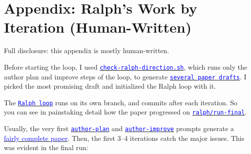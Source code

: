 \clearpage
\section{Appendix: Ralph's Work by Iteration (Human-Written)} \label{appendix:iter-log}

\providecommand{\rloopcommit}[2]{\href{https://github.com/chenandrewy/ralph-wiggum-asset-pricing/commit/#2}{\textcolor{blue}{\texttt{#1}}}}
\providecommand{\testresult}[1]{\href{https://github.com/chenandrewy/ralph-wiggum-asset-pricing/blob/42ce3a298a6c9e9ec144949346034b8af9055646/test-results/#1.md}{\textcolor{blue}{\texttt{#1}}}}
\providecommand{\penultimatetestresult}[1]{\href{https://github.com/chenandrewy/ralph-wiggum-asset-pricing/blob/36c13367ef5980dcf1e7e4963d89a7722c8377d0/test-results/#1.md}{\textcolor{blue}{\texttt{#1}}}}
\providecommand{\finaltestresult}[1]{\href{https://github.com/chenandrewy/ralph-wiggum-asset-pricing/blob/bf0af226ad2d15302dbe1c2878a1c2f66192e340/test-results/#1.md}{\textcolor{blue}{\texttt{#1}}}}

Full disclosure: this appendix is mostly human-written.

Before starting the loop, I used \href{https://github.com/chenandrewy/ralph-wiggum-asset-pricing/blob/main/check-ralph-direction.sh}{\textcolor{blue}{\texttt{check-ralph-direction.sh}}}, which runs only the author plan and improve steps of the loop, to generate \href{https://github.com/chenandrewy/ralph-wiggum-asset-pricing/tree/human-preface/ralph-garage/check-direction}{\textcolor{blue}{\texttt{several paper drafts}}}. I picked the most promising draft and initialized the Ralph loop with it.

The \href{https://github.com/chenandrewy/ralph-wiggum-asset-pricing/blob/main/ralph/ralph-loop.sh}{\textcolor{blue}{\texttt{Ralph loop}}} runs on its own branch, and commits after each iteration. So you can see in painstaking detail how the paper progressed on \href{https://github.com/chenandrewy/ralph-wiggum-asset-pricing/commits/ralph/run-final/}{\textcolor{blue}{\texttt{ralph/run-final}}}.

Usually, the very first \href{https://github.com/chenandrewy/ralph-wiggum-asset-pricing/blob/main/ralph/author-plan.py}{\textcolor{blue}{\texttt{author-plan}}} and \href{https://github.com/chenandrewy/ralph-wiggum-asset-pricing/blob/main/ralph/author-improve.py}{\textcolor{blue}{\texttt{author-improve}}} prompts generate a \href{https://github.com/chenandrewy/ralph-wiggum-asset-pricing/blob/final-pass/ralph-garage/history/001-paper.pdf}{\textcolor{blue}{fairly complete paper}}. Then, the first 3--4 iterations catch the major issues. This was evident in the final run:

